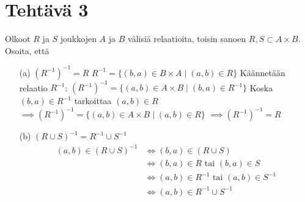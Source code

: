 \documentclass{article}
\begin{document}
    \newpage
	\section*{Tehtävä 3}
    Olkoot $R$ ja $S$ joukkojen $A$ ja $B$ välisiä relaatioita, toisin sanoen $R, S  \subset  A \times B$. Osoita, että
    \begin{enumerate}
        \item[(a)] $(R^{-1})^{-1} = R$ \newline
        $R^{-1} = \{ (b, a) \in B \times A \mid (a, b) \in R \}$\newline
        Käännetään relaatio $R^{-1}$:\newline
        $(R^{-1})^{-1} = \{ (a, b) \in A \times B \mid (b, a) \in R^{-1} \}$\newline
        Koska $(b, a) \in R^{-1}$ tarkoittaa $(a, b) \in R$\newline
        $\implies (R^{-1})^{-1} = \{ (a, b) \in A \times B \mid (a, b) \in R \}$\newline
        $\implies  (R^{-1})^{-1} = R$
        \item[(b)] $(R \cup S)^{-1} = R^{-1} \cup S^{-1} $
        \[
            \begin{aligned}
                (a,b) \in (R \cup S)^{-1} &\Longleftrightarrow (b,a) \in (R \cup S)\\
                &\Longleftrightarrow (b,a) \in R \text{ tai } (b,a) \in S\\
                &\Longleftrightarrow (a,b) \in R^{-1} \text{ tai } (a,b) \in S^{-1}\\
                &\Longleftrightarrow (a,b) \in R^{-1} \cup S^{-1}\\
            \end{aligned}
        \]
        \end{enumerate}
\end{document}
